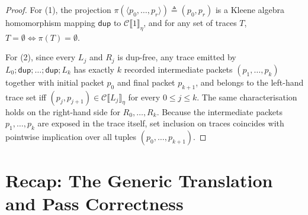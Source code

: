 \documentclass[11pt,a4paper]{article}
\theoremstyle{definition}
\theoremstyle{remark}
\newcommand{\Csem}[1]{\mathcal{C}\llbracket #1 \rrbracket}
\begin{document}
\begin{proof}
For (1), the projection $\pi(\langle p_0, \dots, p_r \rangle) \triangleq (p_0, p_r)$ is a Kleene
algebra homomorphism mapping $\mathsf{dup}$ to $\Csem{1}_\eta$, and for any set of traces $T$,
$T = \emptyset \iff \pi(T) = \emptyset$.

For (2), since every $L_j$ and $R_j$ is dup-free, any trace emitted by
$L_0 ; \mathsf{dup} ; \dots ; \mathsf{dup} ; L_k$ has exactly $k$ recorded intermediate packets
$(p_1, \dots, p_k)$ together with initial packet $p_0$ and final packet $p_{k+1}$, and belongs to
the left-hand trace set iff $(p_j, p_{j+1}) \in \Csem{L_j}_\eta$ for every $0 \le j \le k$. The same
characterisation holds on the right-hand side for $R_0, \dots, R_k$. Because the intermediate
packets $p_1, \dots, p_k$ are exposed in the trace itself, set inclusion on traces coincides with
pointwise implication over all tuples $(p_0, \dots, p_{k+1})$.
\end{proof}

\section{Recap: The Generic Translation and Pass Correctness}
\end{document}

